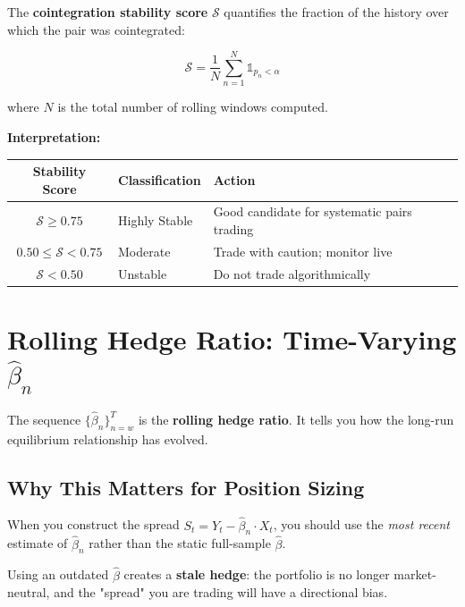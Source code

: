 \documentclass[12pt, a4paper]{article}
\begin{document}
The \textbf{cointegration stability score} $\mathcal{S}$ quantifies the fraction of the history 
over which the pair was cointegrated:

\begin{equation}
    \boxed{
    \mathcal{S} = \frac{1}{N} \sum_{n=1}^{N} \mathbb{1}_{p_n < \alpha}
    }
    \label{eq:stability}
\end{equation}

where $N$ is the total number of rolling windows computed.

\textbf{Interpretation:}
\begin{center}
\begin{tabular}{@{}cll@{}}
\toprule
\textbf{Stability Score} & \textbf{Classification} & \textbf{Action} \\
\midrule
$\mathcal{S} \geq 0.75$ & Highly Stable  & Good candidate for systematic pairs trading \\
$0.50 \leq \mathcal{S} < 0.75$ & Moderate & Trade with caution; monitor live \\
$\mathcal{S} < 0.50$ & Unstable  & Do not trade algorithmically \\
\bottomrule
\end{tabular}
\end{center}

\section{Rolling Hedge Ratio: Time-Varying $\hat\beta_n$}

The sequence $\{\hat\beta_n\}_{n=w}^{T}$ is the \textbf{rolling hedge ratio}. 
It tells you how the long-run equilibrium relationship has evolved.

\subsection{Why This Matters for Position Sizing}

When you construct the spread $S_t = Y_t - \hat\beta_n \cdot X_t$, you should use the 
\emph{most recent} estimate of $\hat\beta_n$ rather than the static full-sample $\hat\beta$.

\medskip
Using an outdated $\hat\beta$ creates a \textbf{stale hedge}: the portfolio is no longer 
market-neutral, and the "spread" you are trading will have a directional bias.
\end{document}
